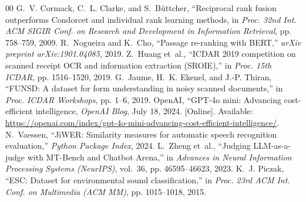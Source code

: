 \begin{thebibliography}{00}
G.~V. Cormack, C.~L. Clarke, and S.~B{\"u}ttcher, ``Reciprocal rank fusion outperforms Condorcet and individual rank learning methods, in \emph{Proc. 32nd Int. ACM SIGIR Conf. on Research and Development in Information Retrieval}, pp. 758--759, 2009.
R.~Nogueira and K.~Cho, ``Passage re-ranking with BERT,'' \emph{arXiv preprint arXiv:1901.04085}, 2019.
Z.~Huang et~al., ``ICDAR 2019 competition on scanned receipt OCR and information extraction (SROIE),'' in \emph{Proc. 15th ICDAR}, pp. 1516--1520, 2019.
G.~Jaume, H.~K. Ekenel, and J.-P. Thiran, ``FUNSD: A dataset for form understanding in noisy scanned documents,'' in \emph{Proc. ICDAR Workshops}, pp. 1--6, 2019.
OpenAI, ``GPT-4o mini: Advancing cost-efficient intelligence, \emph{OpenAI Blog}, July 18, 2024. [Online]. Available: \url{https://openai.com/index/gpt-4o-mini-advancing-cost-efficient-intelligence/}.
N.~Vaessen, ``JiWER: Similarity measures for automatic speech recognition evaluation,'' \emph{Python Package Index}, 2024.
L.~Zheng et~al., ``Judging LLM-as-a-judge with MT-Bench and Chatbot Arena,'' in \emph{Advances in Neural Information Processing Systems (NeurIPS)}, vol.~36, pp. 46595--46623, 2023.
K.~J. Piczak, ``ESC: Dataset for environmental sound classification,'' in \emph{Proc. 23rd ACM Int. Conf. on Multimedia (ACM MM)}, pp. 1015--1018, 2015.
\end{thebibliography}
